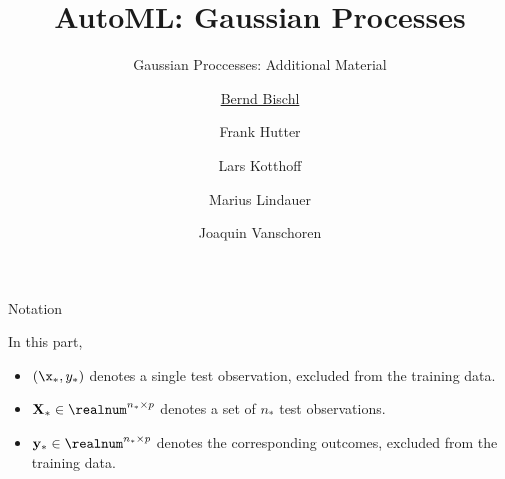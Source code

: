 



\newcommand{\lz}{\vspace{0.5cm}}
\newcommand{\thetab}{\bm{\weights}}
\newcommand{\zero}{\mathbf{0}}
\newcommand{\Xmat}{\mathbf{X}}
\newcommand{\Kmat}{\mathbf{K}}
\newcommand{\ydat}{\mathbf{y}}
\newcommand{\id}{\boldsymbol{I}}
\newcommand{\Amat}{\mathbf{A}}
\newcommand{\Xspace}{\mathcal{X}}                                           
\newcommand{\Yspace}{\mathcal{Y}}
\newcommand{\ls}{\ell}
\newcommand{\natnum}{\mathbb{N}}
\newcommand{\intnum}{\mathbb{Z}}
\newcommand{\order}{\mathcal{O}} 

\usepackage{fontawesome}
\usepackage{dirtytalk}
\usepackage{csquotes}



\title[AutoML: GPs]{AutoML: Gaussian Processes} %
\subtitle{Gaussian Proccesses: Additional Material} %
\author[Marius Lindauer]{\underline{Bernd Bischl} \and Frank Hutter \and Lars Kotthoff\newline \and Marius Lindauer \and Joaquin Vanschoren}
\institute{}
\date{}




\maketitle

\begin{frame}[c]{Notation}

In this part,
\vspace{.3cm}
\begin{itemize}
\item $(\x_*, y_*)$ denotes a single test observation, excluded from the training data.
\vspace{.7cm}
\item $\Xmat_* \in \realnum^{n_* \times p}$ denotes a set of $n_*$ test observations. 
\vspace{.7cm}
\item $\ydat_* \in \realnum^{n_* \times p}$ denotes the corresponding outcomes, excluded from the training data.
\end{itemize}

\end{frame}

